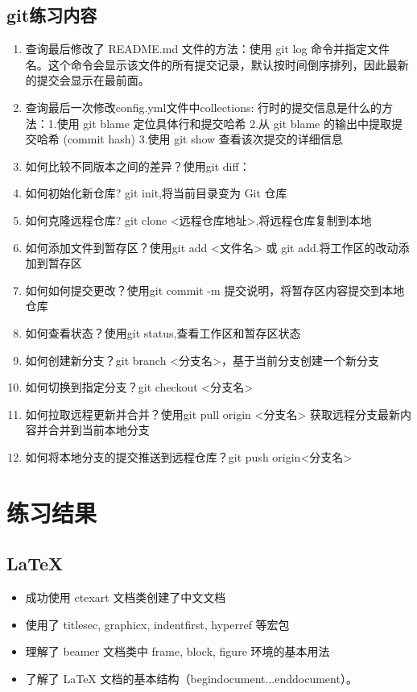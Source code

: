 \documentclass[10.5pt]{ctexart}
\begin{document}
\subsection{git练习内容}
\begin{enumerate} 
    \item 查询最后修改了 README.md 文件的方法：使用 git log 命令并指定文件名。这个命令会显示该文件的所有提交记录，默认按时间倒序排列，因此最新的提交会显示在最前面。
    \item 查询最后一次修改config.yml文件中collections: 行时的提交信息是什么的方法：1.使用 git blame 定位具体行和提交哈希 2.从 git blame 的输出中提取提交哈希 (commit hash) 3.使用 git show 查看该次提交的详细信息
    \item 如何比较不同版本之间的差异？使用git diff：
    \item 如何初始化新仓库?
          git init,将当前目录变为 Git 仓库
    \item 如何克隆远程仓库? git clone <远程仓库地址>,将远程仓库复制到本地
    \item 如何添加文件到暂存区？使用git add <文件名> 或 git add.将工作区的改动添加到暂存区
    \item 如何如何提交更改？使用git commit -m 提交说明，将暂存区内容提交到本地仓库
    \item 如何查看状态？使用git status,查看工作区和暂存区状态
    \item 如何创建新分支？git branch <分支名>，基于当前分支创建一个新分支
    \item 如何切换到指定分支？git checkout <分支名>
    \item 如何拉取远程更新并合并？使用git pull origin <分支名>	获取远程分支最新内容并合并到当前本地分支
    \item 如何将本地分支的提交推送到远程仓库？git push origin<分支名>
\end{enumerate}
\section{练习结果}
\subsection{LaTeX}
\begin{itemize}
\item 成功使用 ctexart 文档类创建了中文文档
\item 使用了 titlesec, graphicx, indentfirst, hyperref 等宏包
\item 理解了 beamer 文档类中 frame, block, figure 环境的基本用法
\item 了解了 LaTeX 文档的基本结构（begin{document}...end{document}）。
\end{itemize}
\end{document}
